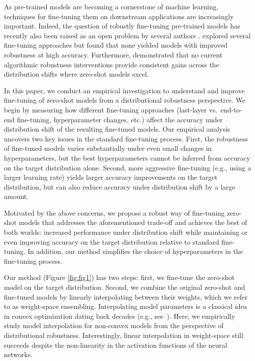 As pre-trained models are becoming a cornerstone of machine learning, techniques for fine-tuning them on downstream applications are increasingly important.
Indeed, the question of robustly fine-tuning pre-trained models has recently also been raised as an open problem by several authors 
\cite{andreassen2021evolution,bommasani2021opportunities,radford2021learning,pham2021scaling}.
\citet{andreassen2021evolution} explored several fine-tuning approaches but found that none yielded models with improved robustness at high accuracy.
Furthermore, \citet{taori2020measuring} demonstrated that no current algorithmic robustness interventions provide consistent gains across the distribution shifts where zero-shot models excel.


In this paper, we conduct an empirical investigation to understand and improve fine-tuning of zero-shot models from a distributional robustness perspective.
We begin by measuring how different fine-tuning approaches (last-layer vs.\ end-to-end fine-tuning, hyperparameter changes, etc.) affect the accuracy under distribution shift of the resulting fine-tuned models.
Our empirical analysis uncovers two key issues in the standard fine-tuning process.
First, the robustness of fine-tuned models varies substantially under even small changes in hyperparameters, but the best hyperparameters cannot be inferred from accuracy on the target distribution alone.
Second, more aggressive fine-tuning (e.g., using a larger learning rate) yields larger accuracy improvements on the target distribution, but can also reduce accuracy under distribution shift by a large amount.



Motivated by the above concerns, we propose a robust way of fine-tuning zero-shot models that addresses the aforementioned trade-off and achieves the best of both worlds: increased performance under distribution shift while maintaining or even improving accuracy on the target distribution relative to standard fine-tuning.
In addition, our method simplifies the choice of hyperparameters in the fine-tuning process.

Our method (Figure \ref{fig:fig1}) has two steps: first, we fine-tune the zero-shot model on the target distribution.
Second, we combine the original zero-shot and fine-tuned models by linearly interpolating between their weights, which we refer to as weight-space ensembling.
Interpolating model parameters is a classical idea in convex optimization dating back decades (e.g., see~\cite{ruppert1988efficient, polyak1990new}).
Here, we empirically study model interpolation for non-convex models from the perspective of distributional robustness.
Interestingly, linear interpolation in weight-space still succeeds despite the non-linearity in the activation functions of the neural networks.



